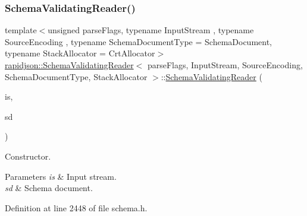 \subsubsection{\texorpdfstring{SchemaValidatingReader()}{SchemaValidatingReader()}}
{\footnotesize\ttfamily template$<$unsigned parse\+Flags, typename Input\+Stream , typename Source\+Encoding , typename Schema\+Document\+Type  = Schema\+Document, typename Stack\+Allocator  = Crt\+Allocator$>$ \\
\mbox{\hyperlink{classrapidjson_1_1_schema_validating_reader}{rapidjson\+::\+Schema\+Validating\+Reader}}$<$ parse\+Flags, Input\+Stream, Source\+Encoding, Schema\+Document\+Type, Stack\+Allocator $>$\+::\mbox{\hyperlink{classrapidjson_1_1_schema_validating_reader}{Schema\+Validating\+Reader}} (\begin{DoxyParamCaption}\item[{Input\+Stream \&}]{is,  }\item[{const Schema\+Document\+Type \&}]{sd }\end{DoxyParamCaption})}



Constructor. 


\begin{DoxyParams}{Parameters}
{\em is} & Input stream. \\
\hline
{\em sd} & Schema document. \\
\hline
\end{DoxyParams}


Definition at line 2448 of file schema.\+h.


\begin{DoxyCode}{0}

\end{DoxyCode}


